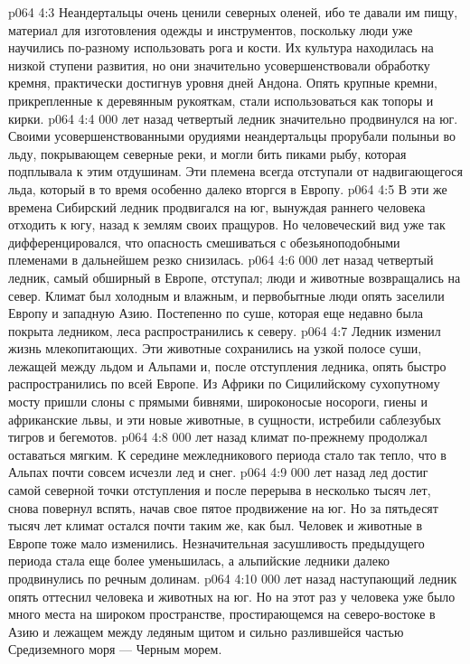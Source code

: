 \vs p064 4:3 Неандертальцы очень ценили северных оленей, ибо те давали им пищу, материал для изготовления одежды и инструментов, поскольку люди уже научились по\hyp{}разному использовать рога и кости. Их культура находилась на низкой ступени развития, но они значительно усовершенствовали обработку кремня, практически достигнув уровня дней Андона. Опять крупные кремни, прикрепленные к деревянным рукояткам, стали использоваться как топоры и кирки.
\vs p064 4:4  000 лет назад четвертый ледник значительно продвинулся на юг. Своими усовершенствованными орудиями неандертальцы прорубали полыньи во льду, покрывающем северные реки, и могли бить пиками рыбу, которая подплывала к этим отдушинам. Эти племена всегда отступали от надвигающегося льда, который в то время особенно далеко вторгся в Европу.
\vs p064 4:5 В эти же времена Сибирский ледник продвигался на юг, вынуждая раннего человека отходить к югу, назад к землям своих пращуров. Но человеческий вид уже так дифференцировался, что опасность смешиваться с обезьяноподобными племенами в дальнейшем резко снизилась.
\vs p064 4:6  000 лет назад четвертый ледник, самый обширный в Европе, отступал; люди и животные возвращались на север. Климат был холодным и влажным, и первобытные люди опять заселили Европу и западную Азию. Постепенно по суше, которая еще недавно была покрыта ледником, леса распространились к северу.
\vs p064 4:7 Ледник изменил жизнь млекопитающих. Эти животные сохранились на узкой полосе суши, лежащей между льдом и Альпами и, после отступления ледника, опять быстро распространились по всей Европе. Из Африки по Сицилийскому сухопутному мосту пришли слоны с прямыми бивнями, широконосые носороги, гиены и африканские львы, и эти новые животные, в сущности, истребили саблезубых тигров и бегемотов.
\vs p064 4:8  000 лет назад климат по\hyp{}прежнему продолжал оставаться мягким. К середине межледникового периода стало так тепло, что в Альпах почти совсем исчезли лед и снег.
\vs p064 4:9  000 лет назад лед достиг самой северной точки отступления и после перерыва в несколько тысяч лет, снова повернул вспять, начав свое пятое продвижение на юг. Но за пятьдесят тысяч лет климат остался почти таким же, как был. Человек и животные в Европе тоже мало изменились. Незначительная засушливость предыдущего периода стала еще более уменьшилась, а альпийские ледники далеко продвинулись по речным долинам.
\vs p064 4:10  000 лет назад наступающий ледник опять оттеснил человека и животных на юг. Но на этот раз у человека уже было много места на широком пространстве, простирающемся на северо\hyp{}востоке в Азию и лежащем между ледяным щитом и сильно разлившейся частью Средиземного моря --- Черным морем.
